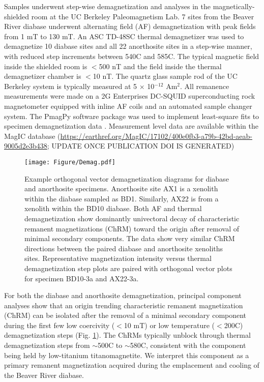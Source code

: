 Samples underwent step-wise demagnetization and analyses in the magnetically-shielded room at the UC Berkeley Paleomagnetism Lab. 7 sites from the Beaver River diabase underwent alternating field (AF) demagnetization with peak fields from 1 mT to 130 mT. An ASC TD-48SC thermal demagnetizer was used to demagnetize 10 diabase sites and all 22 anorthosite sites in a step-wise manner, with reduced step increments between 540\textdegree C and 585\textdegree C. The typical magnetic field inside the shielded room is $<$500 nT and the field inside the thermal demagnetizer chamber is $<$10 nT. The quartz glass sample rod of the UC Berkeley system is typically measured at 5 $\times$ 10$^{-12}$ Am$^{2}$. All remanence measurements were made on a 2G Enterprises DC-SQUID superconducting rock magnetometer equipped with inline AF coils and an automated sample changer system. The PmagPy software package was used to implement least-square fits to specimen demagnetization data \cite{Tauxe2016a}. Measurement level data are available within the MagIC database (\url{https://earthref.org/MagIC/17102/400e0fb3-a79b-42bd-aeab-9005d2e3b438}; UPDATE ONCE PUBLICATION DOI IS GENERATED)

\begin{figure}
\noindent\texttt{[image: Figure/Demag.pdf]}
\caption{\small{Example orthogonal vector demagnetization diagrams for diabase and anorthosite specimens. Anorthosite site AX1 is a xenolith within the diabase sampled as BD1. Similarly, AX22 is from a xenolith within the BD10 diabase. Both AF and thermal demagnetization show dominantly univectoral decay of characteristic remanent magnetizations (ChRM) toward the origin after removal of minimal secondary components. The data show very similar ChRM directions between the paired diabase and anorthosite xenoliths sites. Representative magnetization intensity versus thermal demagnetization step plots are paired with orthogonal vector plots for specimen BD10-3a and AX22-3a.}}
\label{fig:Demag}
\end{figure}

For both the diabase and anorthosite demagnetization, principal component analyses show that an origin trending characteristic remanent magnetization (ChRM) can be isolated after the removal of a minimal secondary component during the first few low coercivity ($<$10 mT) or low temperature ($<$200\textdegree C) demagnetization steps (Fig. \ref{fig:Demag}). The ChRMs typically unblock through thermal demagnetization steps from $\sim$500\textdegree C to $\sim$580\textdegree C, consistent with the component being held by low-titanium titanomagnetite. We interpret this component as a primary remanent magnetization acquired during the emplacement and cooling of the Beaver River diabase.

